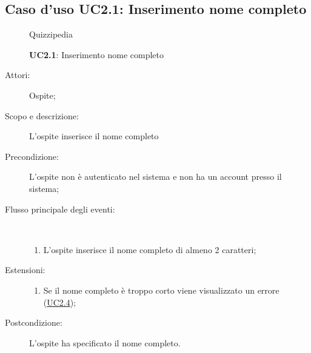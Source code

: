 \subsection{Caso d'uso UC2.1: Inserimento nome completo}
\begin{figure}[H]
	\centering
	\begin{resizedtikzpicture}{\textwidth}
		\begin{umlsystem}[x=0, fill=lightgray!20]{Quizzipedia}
		\end{umlsystem}
	\end{resizedtikzpicture}
	\caption{\textbf{UC2.1}: Inserimento nome completo}
	\label{UC2.1}
\end{figure}
\begin{description}
	\item[Attori:] Ospite;
	\item[Scopo e descrizione:] L'ospite inserisce il nome completo
	\item[Precondizione:] L'ospite non è autenticato nel sistema e non ha un account presso il sistema;
	
	\item[Flusso principale degli eventi:] \ 
	\begin{enumerate}
		\item L'ospite inserisce il nome completo di almeno 2 caratteri;
		
	\end{enumerate}
	\item[Estensioni:]
	\begin{enumerate}
		\item Se il nome completo è troppo corto viene visualizzato un errore (\hyperlink{UC2.4}{UC2.4});
		
	\end{enumerate}
	\item[Postcondizione:] L'ospite ha specificato il nome completo.
\end{description}
\hypertarget{UC2.2}{}
